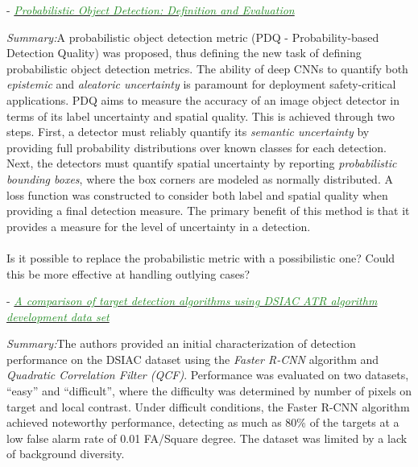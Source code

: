 \documentclass[]{article}
\newcommand{\paperentry}[4]{
            \hangindent=1cm
            \cite{#1} - \href{run:../References/#3}{\textcolor{ForestGreen}{\textit{#2}}}
            
            \noindent            
            \begin{minipage}[t]{0.1\linewidth}\hfill\end{minipage}
            \begin{minipage}[t]{0.8\linewidth}\textcolor{NavyBlue}{{\textit{Summary:}}}#4\end{minipage}
            \vspace{.25cm}
          }
\begin{document}
\paperentry{Hall2019ProbabilisticObjectDetection}
{Probabilistic Object Detection: Definition and Evaluation}
{Army/Hall2019ProbabilisticObjectDetection.pdf}
{A probabilistic object detection metric (PDQ - Probability-based Detection Quality) was proposed, thus defining the new task of defining probabilistic object detection metrics.  The ability of deep CNNs to quantify both \textit{epistemic} and \textit{aleatoric uncertainty} is paramount for deployment safety-critical applications.  PDQ aims to measure the accuracy of an image object detector in terms of its label uncertainty and spatial quality.  This is achieved through two steps.  First, a detector must reliably quantify its \textit{semantic uncertainty} by providing full probability distributions over known classes for each detection.  Next, the detectors must quantify spatial uncertainty by reporting \textit{probabilistic bounding boxes}, where the box corners are modeled as normally distributed.  A loss function was constructed to consider both label and spatial quality when providing a final detection measure.  The primary benefit of this method is that it provides a measure for the level of uncertainty in a detection. \\ \\ Is it possible to replace the probabilistic metric with a possibilistic one?  Could this be more effective at handling outlying cases?} 


\paperentry{Mahalanobis2019DSIACCharacterization}
{A comparison of target detection algorithms using DSIAC ATR algorithm development data set}
{Army/Mahalanobis2019DSIACCharacterization.pdf}
{The authors provided an initial characterization of detection performance on the DSIAC dataset using the \textit{Faster R-CNN} algorithm and \textit{Quadratic Correlation Filter (QCF)}.  Performance was evaluated on two datasets, ``easy'' and ``difficult'', where the difficulty was determined by number of pixels on target and local contrast.  Under difficult conditions, the Faster R-CNN algorithm achieved noteworthy performance, detecting as much as 80\% of the targets at a low false alarm rate of 0.01 FA/Square degree.  The dataset was limited by a lack of background diversity. }
\end{document}
